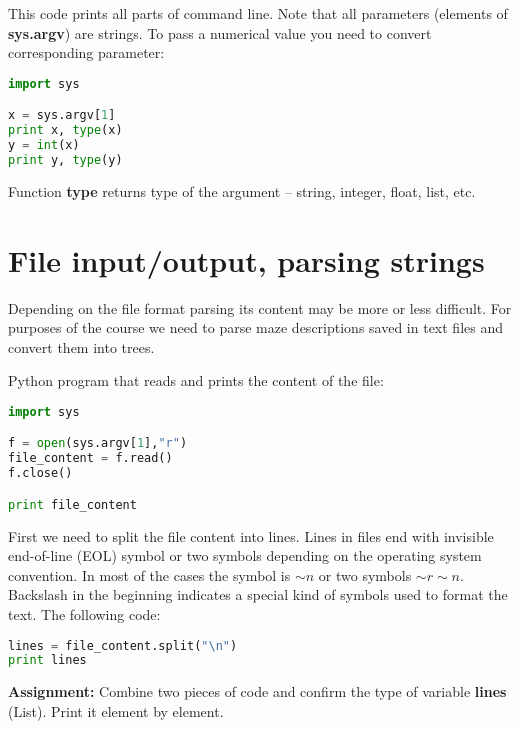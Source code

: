 This code prints all parts of command line. Note that all 
parameters (elements of \textbf{sys.argv}) are strings.
To pass a numerical value you need to convert corresponding parameter:

\begin{lstlisting}[language=Python,style=codelst2,caption={Python: numbers in command line}]
import sys

x = sys.argv[1]
print x, type(x)
y = int(x)
print y, type(y)
\end{lstlisting}

Function \textbf{type} returns type of the argument --
string, integer, float, list, etc.


\section{File input/output, parsing strings}

Depending on the file format parsing its content 
may be more or less difficult.
For purposes of the course we need to parse maze descriptions 
saved in text files and convert them into trees.

Python program that reads and prints the content of the file:

\begin{lstlisting}[language=Python,style=codelst2,caption={Reading file and printing its content}]
import sys

f = open(sys.argv[1],"r")
file_content = f.read()
f.close()

print file_content
\end{lstlisting}

First we need to split the file content into lines. Lines in files
end with invisible end-of-line (EOL) symbol or two 
symbols depending on the
operating system convention. In most of the cases
the symbol is \textbf{$\sim n$} or two symbols \textbf{$\sim r\sim n$}.
Backslash in the beginning indicates a special
kind of symbols used to format the text. The following code:

\begin{lstlisting}[language=Python,style=codelst2,caption={Splitting file into strings}]
lines = file_content.split("\n")
print lines
\end{lstlisting}

\begin{tcolorbox}
\textbf{Assignment:}
Combine two pieces of code and confirm the type of 
variable \textbf{lines} (List).
Print it element by element.
\end{tcolorbox}

